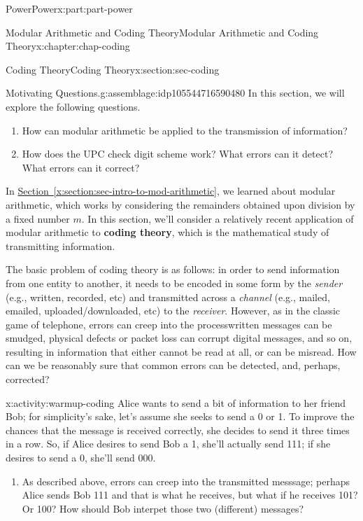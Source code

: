 \documentclass[oneside,10pt,]{book}
\newcommand{\xreffont}{\relax}
\newcommand{\terminology}[1]{\textbf{#1}}
\numberwithin{equation}{section}
\begin{document}
\begin{partptx}{Power}{}{Power}{}{}{x:part:part-power}
\begin{chapterptx}{Modular Arithmetic and Coding Theory}{}{Modular Arithmetic and Coding Theory}{}{}{x:chapter:chap-coding}
%
\begin{sectionptx}{Coding Theory}{}{Coding Theory}{}{}{x:section:sec-coding}
\begin{assemblage}{Motivating Questions.}{g:assemblage:idp105544716590480}%
In this section, we will explore the following questions. %
\begin{enumerate}
\item{}How can modular arithmetic be applied to the transmission of information?%
\item{}How does the UPC check digit scheme work? What errors can it detect? What errors can it correct?%
\end{enumerate}
%
\end{assemblage}
In \hyperref[x:section:sec-intro-to-mod-arithmetic]{Section~{\xreffont\ref{x:section:sec-intro-to-mod-arithmetic}}}, we learned about modular arithmetic, which works by considering the remainders obtained upon division by a fixed number \(m\). In this section, we'll consider a relatively recent application of modular arithmetic to \terminology{coding theory}, which is the mathematical study of transmitting information.%
\par
The basic problem of coding theory is as follows: in order to send information from one entity to another, it needs to be encoded in some form by the \emph{sender} (e.g., written, recorded, etc) and transmitted across a \emph{channel} (e.g., mailed, emailed, uploaded\slash{}downloaded, etc) to the \emph{receiver}. However, as in the classic game of telephone, errors can creep into the process\textemdash{}written messages can be smudged, physical defects or packet loss can corrupt digital messages, and so on, resulting in information that either cannot be read at all, or can be misread. How can we be reasonably sure that common errors can be detected, and, perhaps, corrected?%
\begin{activity}{}{x:activity:warmup-coding}%
Alice wants to send a bit of information to her friend Bob; for simplicity's sake, let's assume she seeks to send a 0 or 1. To improve the chances that the message is received correctly, she decides to send it three times in a row. So, if Alice desires to send Bob a 1, she'll actually send 111; if she desires to send a 0, she'll send 000.%
%
\begin{enumerate}
\item{}As described above, errors can creep into the transmitted messsage; perhaps Alice sends Bob 111 and that is what he receives, but what if he receives 101? Or 100? How should Bob interpet those two (different) messages?%

\end{enumerate}
\end{activity}
\end{sectionptx}
\end{chapterptx}
\end{partptx}
\end{document}
